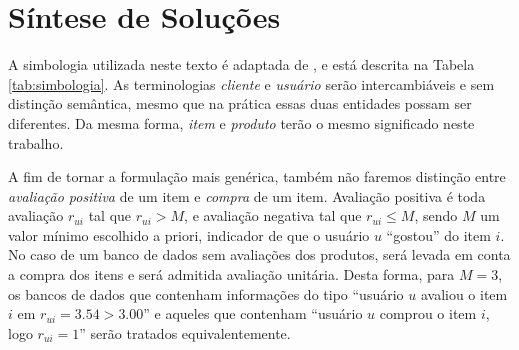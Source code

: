 \chapter[Síntese de Soluções]{Síntese de Soluções}
\label{chap:sintese_de_solucoes}

A simbologia utilizada neste texto é adaptada de \cite{symeonidis2007feature}, e está descrita na Tabela \ref{tab:simbologia}. As terminologias \textit{cliente} e \textit{usuário} serão intercambiáveis e sem distinção semântica, mesmo que na prática essas duas entidades possam ser diferentes. Da mesma forma, \textit{item} e \textit{produto} terão o mesmo significado neste trabalho. 

A fim de tornar a formulação mais genérica, também não faremos distinção entre \textit{avaliação positiva} de um item e \textit{compra} de um item. Avaliação positiva é toda avaliação $r_{ui}$ tal que $r_{ui} > M$, e avaliação negativa tal que $r_{ui} \leq M$, sendo $M$ um valor mínimo escolhido a priori, indicador de que o usuário $u$ ``gostou'' do item $i$. No caso de um banco de dados sem avaliações dos produtos, será levada em conta a compra dos itens e será admitida avaliação unitária. Desta forma, para $M=3$, os bancos de dados que contenham informações do tipo ``usuário $u$ avaliou o item $i$ em $r_{ui} = 3.54 > 3.00$'' e aqueles que contenham ``usuário $u$ comprou o item $i$, logo $r_{ui} = 1$'' serão tratados equivalentemente.

